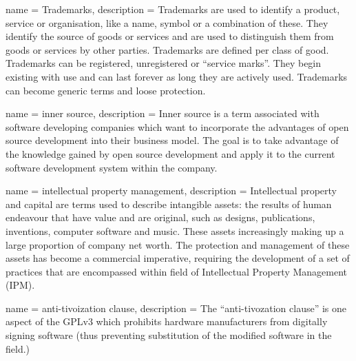  { name = {Trademarks}, description
  = {Trademarks are used to identify a product, service or
    organisation, like a name, symbol or a combination of these. They
    identify the source of goods or services and are used to
    distinguish them from goods or services by other
    parties. Trademarks are defined per class of good. Trademarks can
    be registered, unregistered or “service marks”. They begin
    existing with use and can last forever as long they are actively
    used. Trademarks can become generic terms and loose protection.}}

 { name = {inner source},
  description = {Inner source is a term associated with software
    developing companies which want to incorporate the advantages of
    open source development into their business model. The goal is to
    take advantage of the knowledge gained by open source development
    and apply it to the current software development system within the
    company.\cite{fsry:innersource-2015}}}


 { name = {intellectual property
    management}, description = {Intellectual property and capital are
    terms used to describe intangible assets: the results of human
    endeavour that have value and are original, such as designs,
    publications, inventions, computer software and music.  These
    assets increasingly making up a large proportion of company net
    worth. The protection and management of these assets has become a
    commercial imperative, requiring the development of a set of
    practices that are encompassed within field of Intellectual
    Property Management (IPM).}}

 { name =
  {anti-tivoization clause}, description = {The ``anti-tivozation
    clause'' is one aspect of the GPLv3 which prohibits hardware
    manufacturers from digitally signing software (thus preventing
    substitution of the modified software in the field.)}}
